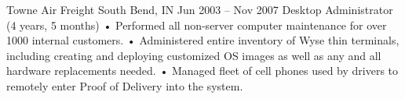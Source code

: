 Towne Air Freight	South Bend, IN	Jun 2003 – Nov 2007
Desktop Administrator		(4 years, 5 months)
•	Performed all non-server computer maintenance for over 1000 internal customers.
•	Administered entire inventory of Wyse thin terminals, including creating and deploying customized OS images as well as any and all hardware replacements needed.
•	Managed fleet of cell phones used by drivers to remotely enter Proof of Delivery into the system.

